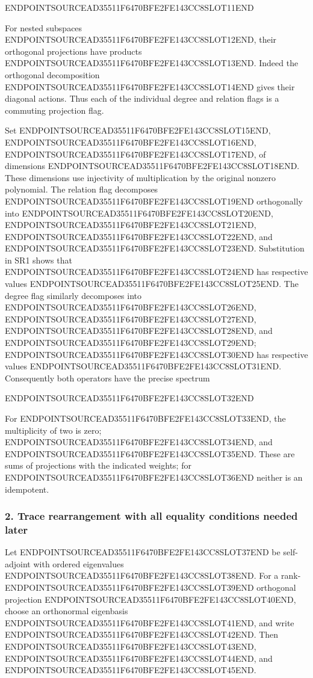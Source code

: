 ENDPOINTSOURCEAD35511F6470BFE2FE143CC8SLOT11END

For nested subspaces ENDPOINTSOURCEAD35511F6470BFE2FE143CC8SLOT12END, their orthogonal projections have products ENDPOINTSOURCEAD35511F6470BFE2FE143CC8SLOT13END. Indeed the orthogonal decomposition ENDPOINTSOURCEAD35511F6470BFE2FE143CC8SLOT14END gives their diagonal actions. Thus each of the individual degree and relation flags is a commuting projection flag.

Set ENDPOINTSOURCEAD35511F6470BFE2FE143CC8SLOT15END, ENDPOINTSOURCEAD35511F6470BFE2FE143CC8SLOT16END, ENDPOINTSOURCEAD35511F6470BFE2FE143CC8SLOT17END, of dimensions ENDPOINTSOURCEAD35511F6470BFE2FE143CC8SLOT18END. These dimensions use injectivity of multiplication by the original nonzero polynomial. The relation flag decomposes ENDPOINTSOURCEAD35511F6470BFE2FE143CC8SLOT19END orthogonally into ENDPOINTSOURCEAD35511F6470BFE2FE143CC8SLOT20END, ENDPOINTSOURCEAD35511F6470BFE2FE143CC8SLOT21END, ENDPOINTSOURCEAD35511F6470BFE2FE143CC8SLOT22END, and ENDPOINTSOURCEAD35511F6470BFE2FE143CC8SLOT23END. Substitution in SR1 shows that ENDPOINTSOURCEAD35511F6470BFE2FE143CC8SLOT24END has respective values ENDPOINTSOURCEAD35511F6470BFE2FE143CC8SLOT25END. The degree flag similarly decomposes into ENDPOINTSOURCEAD35511F6470BFE2FE143CC8SLOT26END, ENDPOINTSOURCEAD35511F6470BFE2FE143CC8SLOT27END, ENDPOINTSOURCEAD35511F6470BFE2FE143CC8SLOT28END, and ENDPOINTSOURCEAD35511F6470BFE2FE143CC8SLOT29END; ENDPOINTSOURCEAD35511F6470BFE2FE143CC8SLOT30END has respective values ENDPOINTSOURCEAD35511F6470BFE2FE143CC8SLOT31END. Consequently both operators have the precise spectrum

ENDPOINTSOURCEAD35511F6470BFE2FE143CC8SLOT32END

For ENDPOINTSOURCEAD35511F6470BFE2FE143CC8SLOT33END, the multiplicity of two is zero; ENDPOINTSOURCEAD35511F6470BFE2FE143CC8SLOT34END, and ENDPOINTSOURCEAD35511F6470BFE2FE143CC8SLOT35END. These are sums of projections with the indicated weights; for ENDPOINTSOURCEAD35511F6470BFE2FE143CC8SLOT36END neither is an idempotent.

\subsubsection{2. Trace rearrangement with all equality conditions needed later}\label{endpoint-four_window_sharpness_review--trace-rearrangement-with-all-equality-conditions-needed-later}

Let ENDPOINTSOURCEAD35511F6470BFE2FE143CC8SLOT37END be self-adjoint with ordered eigenvalues ENDPOINTSOURCEAD35511F6470BFE2FE143CC8SLOT38END. For a rank-ENDPOINTSOURCEAD35511F6470BFE2FE143CC8SLOT39END orthogonal projection ENDPOINTSOURCEAD35511F6470BFE2FE143CC8SLOT40END, choose an orthonormal eigenbasis ENDPOINTSOURCEAD35511F6470BFE2FE143CC8SLOT41END, and write ENDPOINTSOURCEAD35511F6470BFE2FE143CC8SLOT42END. Then ENDPOINTSOURCEAD35511F6470BFE2FE143CC8SLOT43END, ENDPOINTSOURCEAD35511F6470BFE2FE143CC8SLOT44END, and ENDPOINTSOURCEAD35511F6470BFE2FE143CC8SLOT45END.

